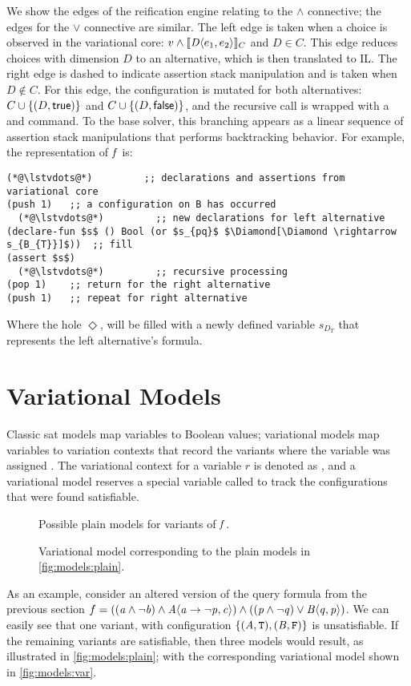 We show the edges of the reification engine relating to the $\wedge$ connective;
the edges for the $\vee$ connective are similar. The left edge is taken when a
choice is observed in the variational core: $v \wedge \sem[C]{\chc[D]{e_{1},
    e_{2}}}$ and $D \in C$. This edge reduces choices with dimension $D$ to an
alternative, which is then translated to IL. The right edge is dashed to
indicate assertion stack manipulation and is taken when $D \notin C$. For this
edge, the configuration is mutated for both alternatives: $C \cup \{(D,
\true)\}$ and $C \cup \{(D, \false)\}$, and the recursive call is wrapped with a
 and  command. To the base solver, this branching appears as a
linear sequence of assertion stack manipulations that performs backtracking
behavior. For example, the representation of $\mathit{f}$ is:
%
\begin{lstlisting}[columns=flexible,keepspaces=true,language=SMTLIB]
  (*@\lstvdots@*)         ;; declarations and assertions from variational core
(push 1)   ;; a configuration on B has occurred
  (*@\lstvdots@*)         ;; new declarations for left alternative
(declare-fun $s$ () Bool (or $s_{pq}$ $\Diamond[\Diamond \rightarrow s_{B_{T}}]$))  ;; fill
(assert $s$)
  (*@\lstvdots@*)         ;; recursive processing
(pop 1)    ;; return for the right alternative
(push 1)   ;; repeat for right alternative
\end{lstlisting}
%
Where the hole $\Diamond$, will be filled with a newly defined variable
$s_{D_{T}}$ that represents the left alternative's formula.


\section{Variational Models}%
\label{section:vmodels}
%
Classic \ac{sat} models map variables to Boolean values; variational models map
variables to variation contexts that record the variants where the variable was
assigned \tru{}. The variational context for a variable $r$ is denoted as
, and a variational model reserves a special variable called \SatVar{} to
track the configurations that were found satisfiable.
%
\begin{figure}[h]
  \centering
  
  \caption{Possible plain models for variants of $\mathit{f}$.}%
  \label{fig:models:plain}
\end{figure}
\begin{figure}[h]
  \centering
  
  \caption{Variational model corresponding to the plain models in
    \autoref{fig:models:plain}.}%
  \label{fig:models:var}
\end{figure}
%
As an example, consider an altered version of the query formula from the
previous section $f = ((\aV{} \wedge \neg \bV{}) \wedge \chc[A]{\aV{}
  \rightarrow \neg \pV{}, \cV{}}) \wedge ((\pV{} \wedge \neg \qV{}) \vee
\chc[B]{\qV{}, \pV{}})$. We can easily see that one variant, with configuration
$\{(\mathit{A}{},\texttt{T}{}), (\mathit{B}{},\texttt{F}{})\}$ is unsatisfiable. If the remaining variants
are satisfiable, then three models would result, as illustrated in
\autoref{fig:models:plain}; with the corresponding variational model shown in
\autoref{fig:models:var}.

